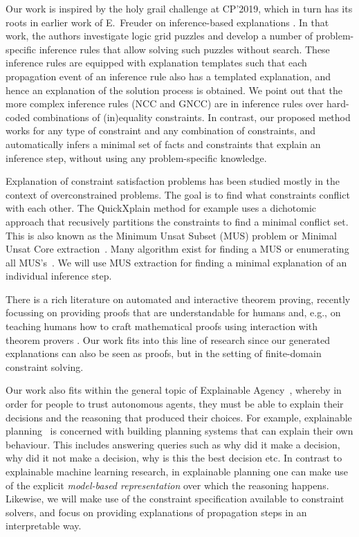 Our work is inspired by the holy grail challenge at CP'2019, which in turn has its roots in earlier work of E.~Freuder on inference-based explanations \cite{sqalli1996inference}. In that work, the authors investigate logic grid puzzles and develop a number of problem-specific inference rules that allow solving such puzzles without search. These inference rules are equipped with explanation templates such that each propagation event of an inference rule also has a templated explanation, and hence an explanation of the solution process is obtained. We point out that the more complex inference rules (NCC and GNCC) are in inference rules over hard-coded combinations of (in)equality constraints. In contrast, our proposed method works for any type of constraint and any combination of constraints, and automatically infers a minimal set of facts and constraints that explain an inference step, without using any problem-specific knowledge.

Explanation of constraint satisfaction problems has been studied mostly in the context of overconstrained problems. The goal is to find what constraints conflict with each other. The QuickXplain method \cite{junker2001quickxplain} for example uses a dichotomic approach that recusively partitions the constraints to find a minimal conflict set. This is also known as the Minimum Unsat Subset (MUS) problem or Minimal Unsat Core extraction~\cite{marques2010minimal}. Many algorithm exist for finding a MUS or enumerating all MUS's~\cite{marques2010minimal}. We will use MUS extraction for finding a minimal explanation of an individual inference step.

There is a rich literature on automated and interactive theorem proving, recently focussing on providing proofs that are understandable for humans \cite{Ganesalingam2017} and, e.g.,  on teaching humans how to craft mathematical proofs using interaction with theorem provers \cite{DBLP:conf/icml/YangD19}. 
Our work fits into this line of research since our generated explanations can also be seen as proofs, but in the setting of finite-domain constraint solving.

Our work also fits within the general topic of Explainable Agency~\cite{langley2017explainable}, whereby in order for people to trust autonomous agents, they must be able to explain their decisions and the reasoning that produced their choices. For example, explainable planning~\cite{fox2017explainable} is concerned with building planning systems that can explain their own behaviour. This includes answering queries such as why did it make a decision, why did it not make a decision, why is this the best decision etc. In contrast to explainable machine learning research, in explainable planning one can make use of the explicit \textit{model-based representation} over which the reasoning happens. Likewise, we will make use of the constraint specification available to constraint solvers, and focus on providing explanations of propagation steps in an interpretable way.


